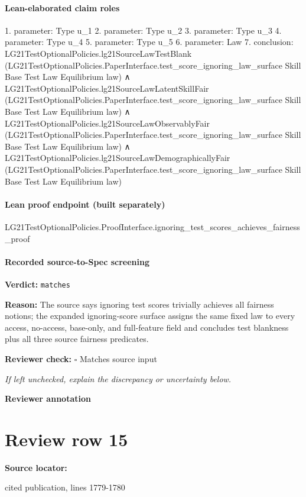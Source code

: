 \documentclass[10pt]{article}
\newcommand{\reviewerbox}{%
  \par\noindent\fbox{\parbox{0.96\linewidth}{\rule{0pt}{0.38in}}}\par
}
\newcommand{\reviewmatch}[1]{%
  \par\noindent\textbf{Reviewer check:} $\square$\; #1\par
  \noindent\emph{If left unchecked, explain the discrepancy or uncertainty below.}\par
}
\begin{document}
\paragraph{Lean-elaborated claim roles}\begin{ReviewVerbatim}
1. parameter: Type u_1
2. parameter: Type u_2
3. parameter: Type u_3
4. parameter: Type u_4
5. parameter: Type u_5
6. parameter: Law
7. conclusion: LG21TestOptionalPolicies.lg21SourceLawTestBlank
    (LG21TestOptionalPolicies.PaperInterface.test_score_ignoring_law_surface Skill Base Test Law Equilibrium law) ∧
  LG21TestOptionalPolicies.lg21SourceLawLatentSkillFair
      (LG21TestOptionalPolicies.PaperInterface.test_score_ignoring_law_surface Skill Base Test Law Equilibrium law) ∧
    LG21TestOptionalPolicies.lg21SourceLawObservablyFair
        (LG21TestOptionalPolicies.PaperInterface.test_score_ignoring_law_surface Skill Base Test Law Equilibrium law) ∧
      LG21TestOptionalPolicies.lg21SourceLawDemographicallyFair
        (LG21TestOptionalPolicies.PaperInterface.test_score_ignoring_law_surface Skill Base Test Law Equilibrium law)
\end{ReviewVerbatim}

\paragraph{Lean proof endpoint (built separately)}\begin{ReviewVerbatim}
LG21TestOptionalPolicies.ProofInterface.ignoring_test_scores_achieves_fairness_proof
\end{ReviewVerbatim}

\paragraph{Recorded source-to-Spec screening}
\textbf{Verdict:} \texttt{matches}
\\
{\raggedright
\textbf{Reason:} The source says ignoring test scores trivially achieves all fairness notions;\allowbreak{} the expanded ignoring-\allowbreak{}score surface assigns the same fixed law to every access, no-\allowbreak{}access, base-\allowbreak{}only, and full-\allowbreak{}feature field and concludes test blankness plus all three source fairness predicates.\allowbreak{}
\par}
\reviewmatch{Matches source input}
\noindent\textbf{Reviewer annotation}\par
\reviewerbox
\clearpage
\hypertarget{source-claim-7e4feebf10ba2ae8}{}
\section*{Review row 15}
\textbf{Source locator:} {\footnotesize\raggedright cited publication, lines 1779-\allowbreak{}1780\par}
\end{document}
